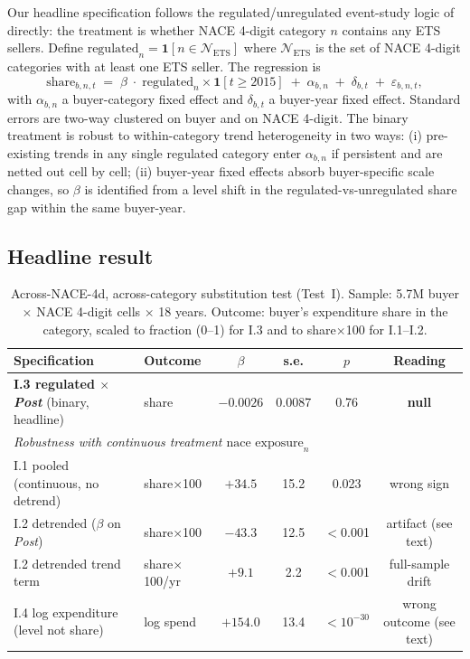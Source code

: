 Our headline specification follows the regulated/unregulated event-study logic of \citet{colmeretal2023} directly: the treatment is whether NACE 4-digit category $n$ contains any ETS sellers. Define $\text{regulated}_n = \mathbf{1}[n \in \mathcal{N}_{\text{ETS}}]$ where $\mathcal{N}_{\text{ETS}}$ is the set of NACE 4-digit categories with at least one ETS seller. The regression is
\begin{equation}
    \text{share}_{b,n,t} \;=\; \beta\;\cdot\;\text{regulated}_n \times \mathbf{1}[t \geq 2015] \;+\; \alpha_{b,n} \;+\; \delta_{b,t} \;+\; \varepsilon_{b,n,t},
    \label{eq:test_i_spec}
\end{equation}
with $\alpha_{b,n}$ a buyer-category fixed effect and $\delta_{b,t}$ a buyer-year fixed effect. Standard errors are two-way clustered on buyer and on NACE 4-digit. The binary treatment is robust to within-category trend heterogeneity in two ways: (i) pre-existing trends in any single regulated category enter $\alpha_{b,n}$ if persistent and are netted out cell by cell; (ii) buyer-year fixed effects absorb buyer-specific scale changes, so $\beta$ is identified from a level shift in the regulated-vs-unregulated share gap within the same buyer-year.

\subsection{Headline result}

\begin{table}[H]
    \centering
    \caption{Across-NACE-4d, across-category substitution test (Test~I). Sample: 5.7M buyer $\times$ NACE 4-digit cells $\times$ 18 years. Outcome: buyer's expenditure share in the category, scaled to fraction (0--1) for I.3 and to share$\times$100 for I.1--I.2.}
    \label{tab:test_i_main}
    \begin{tabular}{llcccc}
        \toprule
        Specification & Outcome & $\beta$ & s.e. & $p$ & Reading \\
        \midrule
        \textbf{I.3 regulated $\times$ \textit{Post}} (binary, headline) & share & $-0.0026$ & 0.0087 & 0.76 & \textbf{null} \\
        \midrule
        \multicolumn{6}{l}{\emph{Robustness with continuous treatment $\text{nace exposure}_n$}} \\
        I.1 pooled (continuous, no detrend) & share$\times$100 & $+34.5$ & 15.2 & 0.023 & wrong sign \\
        I.2 detrended ($\beta$ on \textit{Post})  & share$\times$100 & $-43.3$ & 12.5 & $<$0.001 & artifact (see text) \\
        I.2 detrended trend term  & share$\times$100/yr & $+9.1$ & 2.2 & $<$0.001 & full-sample drift \\
        I.4 log expenditure (level not share) & log spend & $+154.0$ & 13.4 & $<10^{-30}$ & wrong outcome (see text) \\
        \bottomrule
    \end{tabular}
\end{table}


